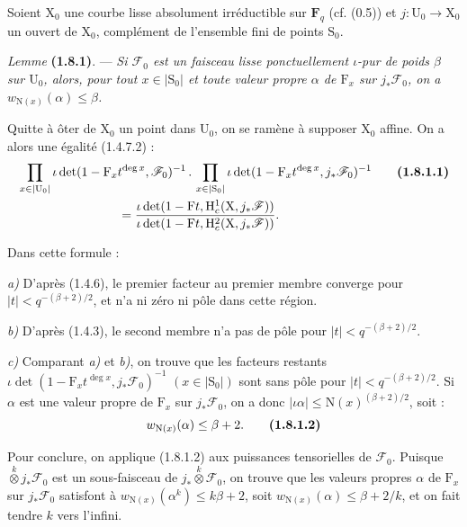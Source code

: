 \documentclass[11pt,leqno]{article}
\begin{document}
Soient \(\mathrm{X}_0\) une courbe lisse absolument irréductible sur \(\mathbf{F}_q\) (cf. (0.5)) et \(j:\mathrm{U}_0\to\mathrm{X}_0\) un ouvert de \(\mathrm{X}_0\), complément de l’ensemble fini de points \(\mathrm{S}_0\).

\textit{Lemme} \textbf{(1.8.1)}. — \textit{Si \(\mathscr{F}_0\) est un faisceau lisse ponctuellement \(\iota\)-pur de poids \(\beta\) sur \(\mathrm{U}_0\), alors, pour tout \(x\in|\mathrm{S}_0|\) et toute valeur propre \(\alpha\) de \(\mathrm{F}_x\) sur \(j_*\mathscr{F}_0\), on a \(w_{\mathrm{N}(x)}(\alpha)\leq\beta\).}

Quitte à ôter de \(\mathrm{X}_0\) un point dans \(\mathrm{U}_0\), on se ramène à supposer \(\mathrm{X}_0\) affine. On a alors une égalité (1.4.7.2) :
\begin{align*}
&\prod_{x\in|\mathrm{U}_0|}
  \iota\det(1-\mathrm{F}_x t^{\deg x},\mathscr{F}_0)^{-1}
  \,.\,
  \prod_{x\in|\mathrm{S}_0|}
  \iota\det(1-\mathrm{F}_x t^{\deg x},j_*\mathscr{F}_0)^{-1}
  \tag*{\textbf{(1.8.1.1)}}\\
&\hspace{8em}=
  \frac{\iota\det(1-\mathrm{F}t,\mathrm{H}_c^1(\mathrm{X},j_*\mathscr{F}))}
       {\iota\det(1-\mathrm{F}t,\mathrm{H}_c^2(\mathrm{X},j_*\mathscr{F}))}.
\end{align*}

Dans cette formule :

\textit{a)} D’après (1.4.6), le premier facteur au premier membre converge pour \(|t|<q^{-(\beta+2)/2}\), et n’a ni zéro ni pôle dans cette région.

\textit{b)} D’après (1.4.3), le second membre n’a pas de pôle pour \(|t|<q^{-(\beta+2)/2}\).

\textit{c)} Comparant \textit{a)} et \textit{b)}, on trouve que les facteurs restants \(\iota\det(1-\mathrm{F}_x t^{\deg x},j_*\mathscr{F}_0)^{-1}\) \((x\in|\mathrm{S}_0|)\) sont sans pôle pour \(|t|<q^{-(\beta+2)/2}\). Si \(\alpha\) est une valeur propre de \(\mathrm{F}_x\) sur \(j_*\mathscr{F}_0\), on a donc \(|\iota\alpha|\leq\mathrm{N}(x)^{(\beta+2)/2}\), soit :
\[
w_{\mathrm{N}(x)}(\alpha)\leq\beta+2.
\tag*{\textbf{(1.8.1.2)}}
\]

Pour conclure, on applique (1.8.1.2) aux puissances tensorielles de \(\mathscr{F}_0\). Puisque \(\mathop{\otimes}\limits^k j_*\mathscr{F}_0\) est un sous-faisceau de \(j_*\mathop{\otimes}\limits^k\mathscr{F}_0\), on trouve que les valeurs propres \(\alpha\) de \(\mathrm{F}_x\) sur \(j_*\mathscr{F}_0\) satisfont à \(w_{\mathrm{N}(x)}(\alpha^k)\leq k\beta+2\), soit \(w_{\mathrm{N}(x)}(\alpha)\leq\beta+2/k\), et on fait tendre \(k\) vers l’infini.
\end{document}
